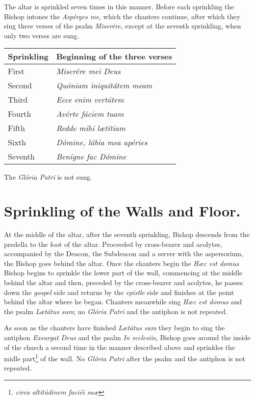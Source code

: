 \documentclass[letterpaper]{report}
\begin{document}
{    \rubric The altar is sprinkled seven times in this manner. Before each
    sprinkling the Bishop intones the \textit{Asp\'erges me,} which the
    chanters continue, after which they sing three verses of the psalm
    \textit{Miser\'ere,} except at the seventh sprinkling, when only two verses
    are sung.

    \begin{tabular}{l l}
        \toprule
        Sprinkling & Beginning of the three verses \\
        \midrule
        First & \textit{Miserére mei Deus} \\
        Second & \textit{Quóniam iniquitátem meam} \\
        Third & \textit{Ecce enim vertátem} \\
        Fourth & \textit{Avérte fáciem tuam} \\
        Fifth & \textit{Redde mihi l\ae títiam} \\
        Sixth & \textit{Dómine, lábia mea apéries} \\
        Seventh & \textit{Benígne fac Dómine} \\
        \bottomrule
    \end{tabular}

    The \textit{Gl\'oria Patri} is not sung.

    \section{Sprinkling of the Walls and Floor.}

    \rubric At the middle of the altar, after the seventh sprinkling, Bishop
    descends from the predella to the foot of the altar. Proceeded by
    cross-bearer and acolytes, accompanied by the Deacon, the Subdeacon and a
    server with the aspersorium, the Bishop goes behind the altar. Once the
    chanters begin the \textit{H\ae c est domus} Bishop begins to sprinkle the
    lower part of the wall, commencing at the middle behind the altar and then,
    preceded by the cross-bearer and acolytes, he passes down the
    \textit{gospel} side and returns by the \textit{epistle} side and finishes
    at the point behind the altar where he began. Chanters meanwhile sing
    \textit{H\ae c est domus} and the psalm \textit{L\ae tátus sum}; no
    \textit{Glória Patri} and the antiphon is not repeated.

    \rubric As soon as the chanters have finished \textit{L\ae t\'atus sum}
    they begin to sing the antiphon \textit{Exsurgat Deus} and the psalm
    \textit{In ecclesiis,} Bishop goes around the inside of the church a second
    time in the manner described above and sprinkles the midle
    part\footnote{\textit{circa altit\'udinem faci\'ei su\ae}} of the wall. No
    \textit{Glória Patri} after the psalm and the antiphon is not repeated.

}
\end{document}
